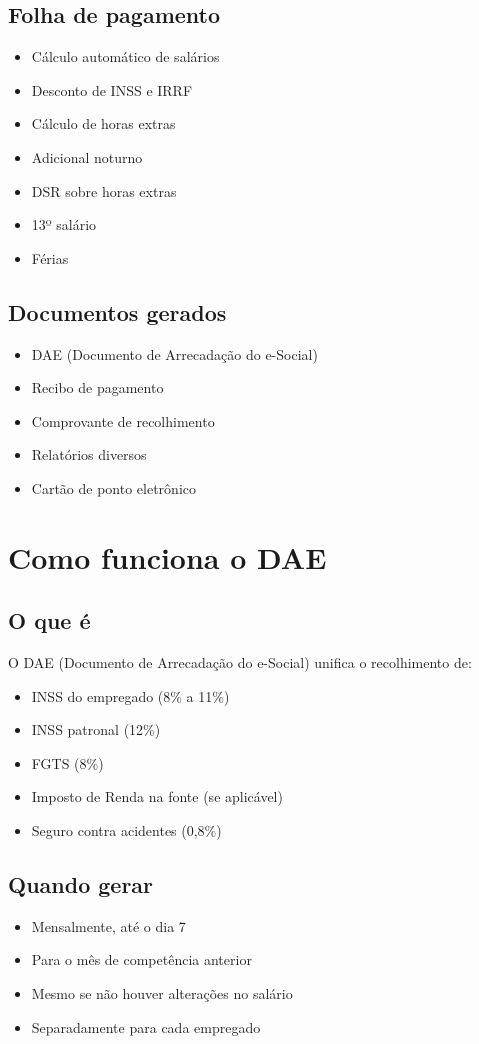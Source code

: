\documentclass[12pt,a4paper]{article}
\begin{document}
\subsection{Folha de pagamento}
\begin{itemize}
    \item Cálculo automático de salários
    \item Desconto de INSS e IRRF
    \item Cálculo de horas extras
    \item Adicional noturno
    \item DSR sobre horas extras
    \item 13º salário
    \item Férias
\end{itemize}

\subsection{Documentos gerados}
\begin{itemize}
    \item DAE (Documento de Arrecadação do e-Social)
    \item Recibo de pagamento
    \item Comprovante de recolhimento
    \item Relatórios diversos
    \item Cartão de ponto eletrônico
\end{itemize}

\section{Como funciona o DAE}

\subsection{O que é}
O DAE (Documento de Arrecadação do e-Social) unifica o recolhimento de:
\begin{itemize}
    \item INSS do empregado (8\% a 11\%)
    \item INSS patronal (12\%)
    \item FGTS (8\%)
    \item Imposto de Renda na fonte (se aplicável)
    \item Seguro contra acidentes (0,8\%)
\end{itemize}

\subsection{Quando gerar}
\begin{itemize}
    \item Mensalmente, até o dia 7
    \item Para o mês de competência anterior
    \item Mesmo se não houver alterações no salário
    \item Separadamente para cada empregado
\end{itemize}
\end{document}
